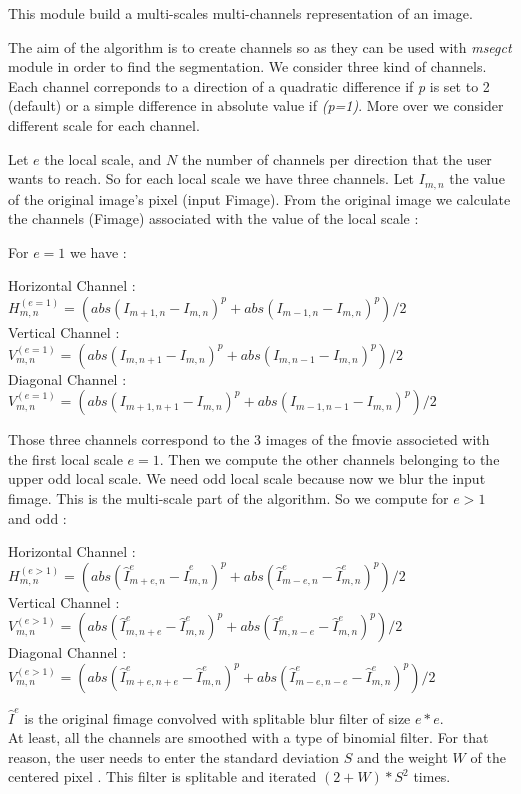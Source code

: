 This module build a multi-scales multi-channels representation of an image.

The aim of the algorithm is  to create channels so as they can be used with {\it msegct} module in order to find the segmentation. We consider three kind of channels. Each channel correponds to a direction of a quadratic difference if {\it p} is set to 2 (default) or a simple difference in absolute value if {\it(p=1)}. More over we consider different scale for each channel. 

Let $e$ the local scale, and $N$ the number of channels per direction that the user wants to reach. So for each local scale we have three channels. 
Let $I_{m,n}$ the value of the original image's pixel (input Fimage). 
From the original image we calculate the channels (Fimage) associated with the value of the local scale : 

For $e=1$ we have : 
\begin{center}
Horizontal Channel : $H_{m,n}^{(e=1)}=(abs(I_{m+1,n}-I_{m,n})^{p}+abs(I_{m-1,n}-I_{m,n})^{p})/2$\\
Vertical Channel   : $V_{m,n}^{(e=1)}=(abs(I_{m,n+1}-I_{m,n})^{p}+abs(I_{m,n-1}-I_{m,n})^{p})/2$\\
Diagonal Channel   : $V_{m,n}^{(e=1)}=(abs(I_{m+1,n+1}-I_{m,n})^{p}+abs(I_{m-1,n-1}-I_{m,n})^{p})/2$\\
\end{center} 
Those three channels correspond to the 3 images of the fmovie associeted with the first local scale $e=1$. Then we compute the other channels belonging to the upper odd local scale. We need odd local scale because now we blur the input fimage. This is the multi-scale part of the algorithm. So we compute for $e>1$ and odd  :\\
\begin{center}
Horizontal Channel : $H_{m,n}^{(e>1)}=(abs(\hat{I}_{m+e,n}^{e}-\hat{I}_{m,n}^{e})^{p}+abs(\hat{I}_{m-e,n}^{e}-\hat{I}_{m,n}^{e})^{p})/2$\\
Vertical Channel   : $V_{m,n}^{(e>1)}=(abs(\hat{I}_{m,n+e}^{e}-\hat{I}_{m,n}^{e})^{p}+abs(\hat{I}_{m,n-e}^{e}-\hat{I}_{m,n}^{e})^{p})/2$\\
Diagonal Channel   : $V_{m,n}^{(e>1)}=(abs(\hat{I}_{m+e,n+e}^{e}-\hat{I}_{m,n}^{e})^{p}+abs(\hat{I}_{m-e,n-e}^{e}-\hat{I}_{m,n}^{e})^{p})/2$\\
\end{center} 
$\hat{I}^{e}$ is the original fimage convolved with splitable blur filter of size $e*e$.\\At least, all the channels are smoothed with a type of binomial filter. For that reason, the user needs to enter the standard deviation $S$ and the weight $W$ of the centered pixel . This filter is splitable and iterated $(2+W)*S^{2}$ times.
